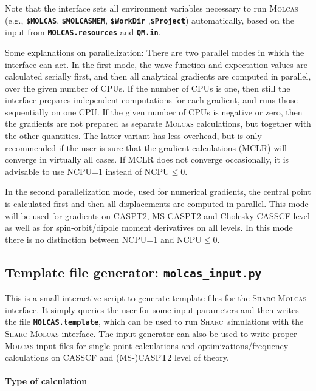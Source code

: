 \documentclass[a4paper,10pt,DIV=15,openany,twoside=false]{scrbook}
\newcommand{\sharc}{\textsc{Sharc}}
\newcommand{\ttt}[1]{\textbf{\texttt{#1}}}
\begin{document}
Note that the interface sets all environment variables necessary to run \textsc{Molcas} (e.g., \ttt{\$MOLCAS}, \ttt{\$MOLCASMEM}, \ttt{\$WorkDir} ,\ttt{\$Project}) automatically, based on the input from \ttt{MOLCAS.resources} and \ttt{QM.in}.

Some explanations on parallelization: There are two parallel modes in which the interface can act. In the first mode, the wave function and expectation values are calculated serially first, and then all analytical gradients are computed in parallel, over the given number of CPUs. If the number of CPUs is one, then still the interface prepares independent computations for each gradient, and runs those sequentially on one CPU. If the given number of CPUs is negative or zero, then the gradients are not prepared as separate \textsc{Molcas} calculations, but together with the other quantities. The latter variant has less overhead, but is only recommended if the user is sure that the gradient calculations (MCLR) will converge in virtually all cases. If MCLR does not converge occasionally, it is advisable to use NCPU=1 instead of NCPU$\leq$0.

In the second parallelization mode, used for numerical gradients, the central point is calculated first and then all displacements are computed in parallel. This mode will be used for gradients on CASPT2, MS-CASPT2 and Cholesky-CASSCF level as well as for spin-orbit/dipole moment derivatives on all levels. In this mode there is no distinction between NCPU=1 and NCPU$\leq$0. 


\subsection{Template file generator: \ttt{molcas\_input.py}}\label{sec:molcas_input.py}

This is a small interactive script to generate template files for the \sharc-\textsc{Molcas} interface. It simply queries the user for some input parameters and then writes the file \ttt{MOLCAS.template}, which can be used to run \sharc\ simulations with the \sharc-\textsc{Molcas} interface.
The input generator can also be used to write proper \textsc{Molcas} input files for single-point calculations and optimizations/frequency calculations on CASSCF and (MS-)CASPT2 level of theory.

\paragraph{Type of calculation}
\end{document}
